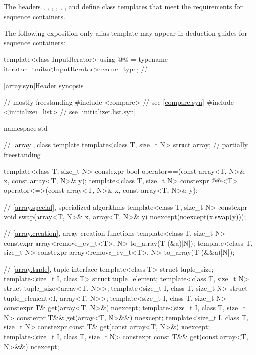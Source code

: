 \pnum
The headers
,
,
,
,
,
, and
define class templates that meet the requirements for sequence containers.

\pnum
The following exposition-only alias template may appear in deduction guides for sequence containers:

\begin{codeblock}
template<class InputIterator>
  using @@ = typename iterator_traits<InputIterator>::value_type;  // \expos
\end{codeblock}

[array.syn]{Header  synopsis}

%
\begin{codeblock}
// mostly freestanding
#include <compare>              // see \ref{compare.syn}
#include <initializer_list>     // see \ref{initializer.list.syn}

namespace std {
  // \ref{array}, class template 
  template<class T, size_t N> struct array;                             // partially freestanding

  template<class T, size_t N>
    constexpr bool operator==(const array<T, N>& x, const array<T, N>& y);
  template<class T, size_t N>
    constexpr @@<T>
      operator<=>(const array<T, N>& x, const array<T, N>& y);

  // \ref{array.special}, specialized algorithms
  template<class T, size_t N>
    constexpr void swap(array<T, N>& x, array<T, N>& y) noexcept(noexcept(x.swap(y)));

  // \ref{array.creation}, array creation functions
  template<class T, size_t N>
    constexpr array<remove_cv_t<T>, N> to_array(T (&a)[N]);
  template<class T, size_t N>
    constexpr array<remove_cv_t<T>, N> to_array(T (&&a)[N]);

  // \ref{array.tuple}, tuple interface
  template<class T> struct tuple_size;
  template<size_t I, class T> struct tuple_element;
  template<class T, size_t N>
    struct tuple_size<array<T, N>>;
  template<size_t I, class T, size_t N>
    struct tuple_element<I, array<T, N>>;
  template<size_t I, class T, size_t N>
    constexpr T& get(array<T, N>&) noexcept;
  template<size_t I, class T, size_t N>
    constexpr T&& get(array<T, N>&&) noexcept;
  template<size_t I, class T, size_t N>
    constexpr const T& get(const array<T, N>&) noexcept;
  template<size_t I, class T, size_t N>
    constexpr const T&& get(const array<T, N>&&) noexcept;
}
\end{codeblock}

